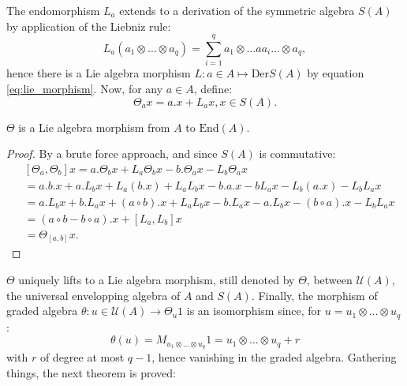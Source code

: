 The endomorphism $L_a$ extends to a derivation of the symmetric algebra $S(A)$ by application of the Liebniz rule:
\begin{equation}
    \label{eq:der_la}
    L_a \left( a_1 \otimes \dots \otimes a_q \right)= \sum_{i=1}^q a_1 \otimes \dots a a_i \dots \otimes a_q,
\end{equation}
hence there is a Lie algebra morphism $L \colon a \in A \mapsto \text{Der}S\left( A \right)$ by equation \ref{eq:lie_morphism}.
Now, for any $a \in A$, define:
\begin{equation}
    \label{eq:theta_morphism}
    \Theta_a x = a. x + L_a x, x \in S\left( A \right).
\end{equation}
\begin{prop}
    \label{prop:theta_morphism}
    $\Theta$ is a Lie algebra morphism from $A$ to $\text{End}(A).$
\end{prop}
\begin{proof}
    By a brute force approach, and since $S(A)$ is commutative:
    \begin{equation}
        \begin{split}
            & \left[ \Theta_a, \Theta_b \right]  x = a .  \Theta_b x + L_a \Theta_b x - b .  \Theta_a x - L_b \Theta_a x \\
            &= a . b . x + a . L_b x + L_a (b. x) + L_a L_b x - b . a . x - b L_a x - L_b (a . x) - L_b L_a x \\
            &= a . L_b x + b . L_a x + (a \circ b) . x +  L_a L_b x - b . L_a x - a . L_b x - (b \circ a). x - L_b L_a x \\
            &= \left( a \circ b - b \circ a \right) . x + \left[ L_a, L_b \right] x \\
            & = \Theta_{[a,b]} x.
        \end{split}
    \end{equation}
\end{proof}
$\Theta$ uniquely lifts to a Lie algebra morphism, still denoted by $\Theta$, between $\mathcal{U}(A)$, the universal envelopping algebra of $A$ and $S(A)$.
Finally, the morphism of graded algebra $ \theta \colon u \in \mathcal{U}(A) \to \Theta_u 1$ is an isomorphism since, for $u=u_1 \otimes \dots \otimes u_q$:
\begin{equation}
    \theta(u)=M_{u_1 \otimes \dots \otimes u_q} 1 = u_1 \otimes \dots \otimes u_q + r
\end{equation}
with $r$ of degree at most $q-1$, hence vanishing in the graded algebra. Gathering things, the next theorem is proved:

